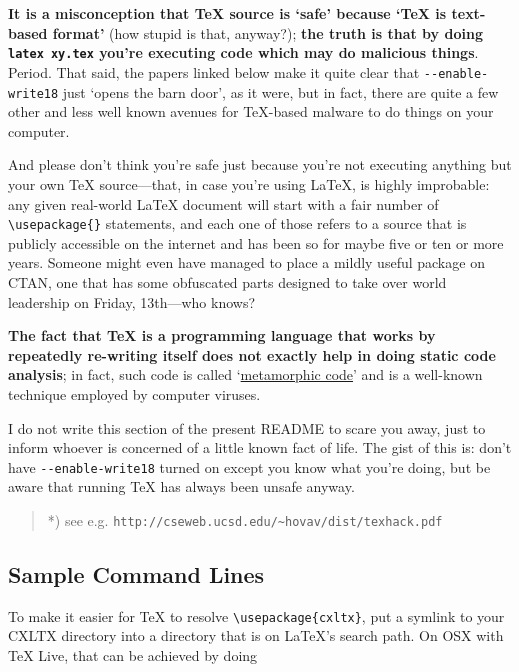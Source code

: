 \textbf{It is a misconception that TeX source is `safe' because `TeX is
text-based format'} (how stupid is that, anyway?); \textbf{the truth is
that by doing \texttt{latex xy.tex} you're executing code which may do
malicious things}. Period. That said, the papers linked below make it
quite clear that \texttt{-{}-enable-write18} just `opens the barn door',
as it were, but in fact, there are quite a few other and less well known
avenues for TeX-based malware to do things on your computer.

And please don't think you're safe just because you're not executing
anything but your own TeX source---that, in case you're using LaTeX, is
highly improbable: any given real-world LaTeX document will start with a
fair number of \texttt{\textbackslash{}usepackage\{\}} statements, and
each one of those refers to a source that is publicly accessible on the
internet and has been so for maybe five or ten or more years. Someone
might even have managed to place a mildly useful package on CTAN, one
that has some obfuscated parts designed to take over world leadership on
Friday, 13th---who knows?

\textbf{The fact that TeX is a programming language that works by
repeatedly re-writing itself does not exactly help in doing static code
analysis}; in fact, such code is called
`\href{http://en.wikipedia.org/wiki/Metamorphic_code}{metamorphic code}'
and is a well-known technique employed by computer viruses.

I do not write this section of the present README to scare you away,
just to inform whoever is concerned of a little known fact of life. The
gist of this is: don't have \texttt{-{}-enable-write18} turned on except
you know what you're doing, but be aware that running TeX has always
been unsafe anyway.

\begin{quote}
*) see e.g.
\texttt{http://cseweb.ucsd.edu/\textasciitilde{}hovav/dist/texhack.pdf}
\end{quote}

\subsection{Sample Command Lines}\label{sample-command-lines}

To make it easier for TeX to resolve
\texttt{\textbackslash{}usepackage\{cxltx\}}, put a symlink to your
CXLTX directory into a directory that is on LaTeX's search path. On OSX
with TeX Live, that can be achieved by doing

